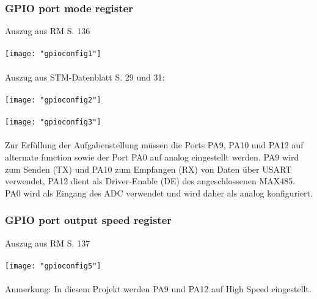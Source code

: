 \documentclass[11pt]{report}
\begin{document}
			\subsubsection{GPIO port mode register}
				Auszug aus RM S. 136\\
				\\\texttt{[image: "gpioconfig1"]}\\
				\\Auszug aus STM-Datenblatt S. 29 und 31:\\
				\\\texttt{[image: "gpioconfig2"]}\\
				\\\texttt{[image: "gpioconfig3"]}\\
				\\Zur Erfüllung der Aufgabenstellung müssen die Ports PA9, PA10 und PA12 auf alternate function sowie der Port PA0 auf analog eingestellt werden. PA9 wird zum Senden (TX) und PA10 zum Empfangen (RX) von Daten über USART verwendet, PA12 dient als Driver-Enable (DE) des angeschlossenen MAX485. PA0 wird als Eingang des ADC verwendet und wird daher als analog konfiguriert.
			\subsubsection{GPIO port output speed register}
				Auszug aus RM S. 137\\
				\\\texttt{[image: "gpioconfig5"]}\\
				\\Anmerkung: In diesem Projekt werden PA9 und PA12 auf High Speed eingestellt.
\end{document}
